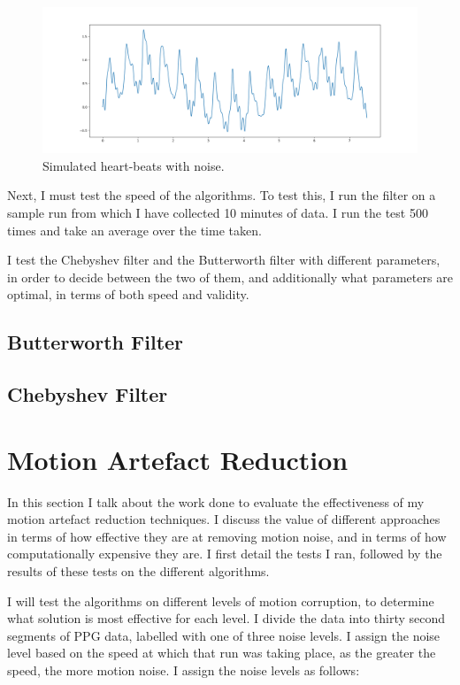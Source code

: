 \documentclass[12pt,a4paper,twoside,openright]{report}
\begin{document}
\begin{figure}[tbh]
	\centerline{\includegraphics[width=1\textwidth]{figs/sim-beats-with-noise.png}}
	\caption{Simulated heart-beats with noise.}
	\label{fig:sim-beats-noise}
\end{figure}

Next, I must test the speed of the algorithms. To test this, I run the filter
on a sample run from which I have collected 10 minutes of data. I run the test
500 times and take an average over the time taken.

I test the Chebyshev filter and the Butterworth filter with different
parameters, in order to decide between the two of them, and additionally what
parameters are optimal, in terms of both speed and validity.

\subsection{Butterworth Filter}

\subsection{Chebyshev Filter}

\section{Motion Artefact Reduction}

In this section I talk about the work done to evaluate the effectiveness of my
motion artefact reduction techniques. I discuss the value of different
approaches in terms of how effective they are at removing motion noise, and in
terms of how computationally expensive they are. I first detail the tests I
ran, followed by the results of these tests on the different algorithms.

I will test the algorithms on different levels of motion corruption, to
determine what solution is most effective for each level. I divide the
data into thirty second segments of PPG data, labelled with one of three
noise levels. I assign the noise level based on the speed at which that run
was taking place, as the greater the speed, the more motion noise. I assign
the noise levels as follows:
\end{document}

